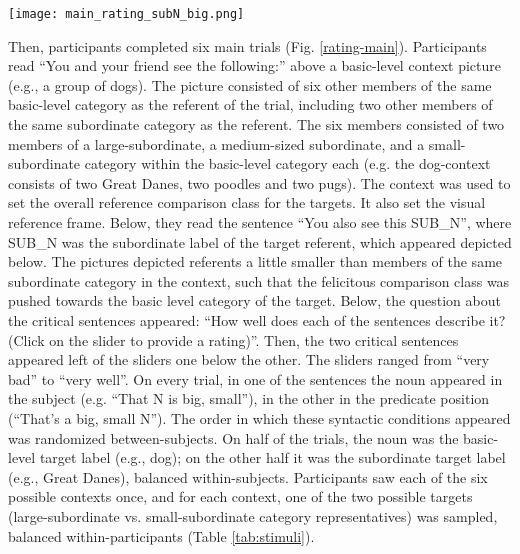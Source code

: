 \begin{figure*}[t]
	\begin{center}
		\texttt{[image: main\_rating\_subN\_big.png]}
	\end{center}
	\caption{Example view of a sentence rating main trial: The critical noun is a subordinate target label of a large-subordinate category, appearing in the subject or predicate of the sentence.}
	\label{rating-main}
\end{figure*}
Then, participants completed six main trials (Fig. \ref{rating-main}). Participants read “You and your friend see the following:” above a basic-level context picture (e.g., a group of dogs). The picture consisted of six other members of the same basic-level category as the referent of the trial, including two other members of the same subordinate category as the referent. The six members consisted of two members of a large-subordinate, a medium-sized subordinate, and a small-subordinate category within the basic-level category each (e.g. the dog-context consists of two Great Danes, two poodles and two pugs). The context was used to set the overall reference comparison class for the targets. It also set the visual reference frame.
Below, they read the sentence “You also see this SUB\_N”, where SUB\_N was the subordinate label of the target referent, which appeared depicted below. The pictures depicted referents a little smaller than members of the same subordinate category in the context, such that the felicitous comparison class was pushed towards the basic level category of the target.
Below, the question about the critical sentences appeared: “How well does each of the sentences describe it? (Click on the slider to provide a rating)”. Then, the two critical sentences appeared left of the sliders one below the other. The sliders ranged from “very bad” to “very well”. On every trial, in one of the sentences the noun appeared in the subject (e.g. “That N is {big, small}”), in the other in the predicate position (“That’s a {big, small} N”). The order in which these syntactic conditions appeared was randomized between-subjects. 
On half of the trials, the noun was the basic-level target label (e.g., dog); on the other half it was the subordinate target label (e.g., Great Danes), balanced within-subjects. 
Participants saw each of the six possible contexts once, and for each context, one of the two possible targets (large-subordinate vs. small-subordinate category representatives) was sampled, balanced within-participants (Table \ref{tab:stimuli}). 

